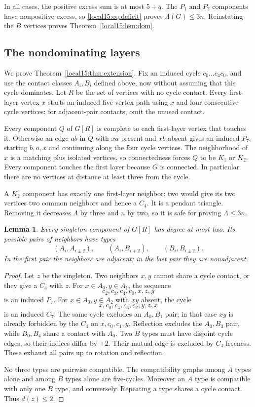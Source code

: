 \documentclass[11pt,a4paper]{article}
\newtheorem{lemma}[theorem]{Lemma}
\theoremstyle{definition}\newtheorem{definition}[theorem]{Definition}
\theoremstyle{remark}\newtheorem{remark}[theorem]{Remark}
\begin{document}
In all cases, the positive excess sum is at most $5+q$. The $P_1$ and
$P_2$ components have nonpositive excess, so \eqref{local15:eq:deficit} proves
$\Lambda(G)\le3n$. Reinstating the $B$ vertices proves
Theorem~\ref{local15:lem:dom}.

\subsection{The nondominating layers}
We prove Theorem~\ref{local15:thm:extension}. Fix an induced cycle
$c_0\dots c_4c_0$, and use the contact classes $A_i,B_i$ defined above,
now without assuming that this cycle dominates. Let $R$ be the set of
vertices with no cycle contact. Every first-layer vertex $x$ starts an
induced five-vertex path using $x$ and four consecutive cycle vertices;
for adjacent-pair contacts, omit the unused contact.

Every component $Q$ of $G[R]$ is complete to each first-layer vertex
that touches it. Otherwise an edge $ab$ in $Q$ with $xa$ present and $xb$
absent gives an induced $P_7$, starting $b,a,x$ and continuing along the
four cycle vertices. The neighborhood of $x$ is a matching plus isolated
vertices, so connectedness forces $Q$ to be $K_1$ or $K_2$. Every
component touches the first layer because $G$ is connected. In particular
there are no vertices at distance at least three from the cycle.

A $K_2$ component has exactly one first-layer neighbor: two would give its
two vertices two common neighbors and hence a $C_4$. It is a pendant
triangle. Removing it decreases $\Lambda$ by three and $n$ by two, so it is
safe for proving $\Lambda\le3n$.

\begin{lemma}\label{local15:lem:Rdegree}
Every singleton component of $G[R]$ has degree at most two. Its possible
pairs of neighbors have types
\[
 (A_i,A_{i\pm2}),\qquad(A_i,B_{i+2}),\qquad(B_i,B_{i\pm2}).
\]
In the first pair the neighbors are adjacent; in the last pair they are
nonadjacent.
\end{lemma}
\begin{proof}
Let $z$ be the singleton. Two neighbors $x,y$ cannot share a cycle contact,
or they give a $C_4$ with $z$. For $x\in A_0,y\in A_1$, the sequence
\[
 c_2,c_3,c_4,c_0,x,z,y
\]
is an induced $P_7$. For $x\in A_0,y\in A_2$ with $xy$ absent, the cycle
\[
 x,c_0,c_4,c_3,c_2,y,z,x
\]
is an induced $C_7$. The same cycle excludes an $A_0,B_1$ pair; in that
case $xy$ is already forbidden by the $C_4$ on $x,c_0,c_1,y$.
Reflection excludes the $A_0,B_3$ pair, while $B_0,B_4$ share a contact
with $A_0$. Two $B$ types must have disjoint cycle edges, so their indices
differ by $\pm2$. Their mutual edge is excluded by $C_4$-freeness.
These exhaust all pairs up to rotation and reflection.

No three types are pairwise compatible. The compatibility graphs among
$A$ types alone and among $B$ types alone are five-cycles. Moreover an
$A$ type is compatible with only one $B$ type, and conversely.
Repeating a type shares a cycle contact. Thus $d(z)\le2$.
\end{proof}
\end{document}

